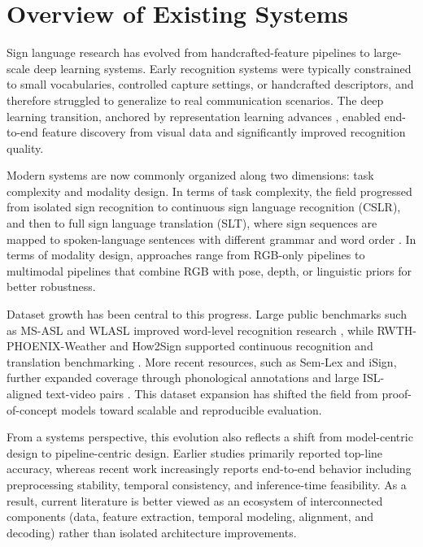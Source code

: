 \section{Overview of Existing Systems}
Sign language research has evolved from handcrafted-feature pipelines to large-scale deep learning systems. Early recognition systems were typically constrained to small vocabularies, controlled capture settings, or handcrafted descriptors, and therefore struggled to generalize to real communication scenarios. The deep learning transition, anchored by representation learning advances \cite{lecun2015deep}, enabled end-to-end feature discovery from visual data and significantly improved recognition quality.

Modern systems are now commonly organized along two dimensions: task complexity and modality design. In terms of task complexity, the field progressed from isolated sign recognition to continuous sign language recognition (CSLR), and then to full sign language translation (SLT), where sign sequences are mapped to spoken-language sentences with different grammar and word order \cite{camgoz2018neural,camgoz2020transformers}. In terms of modality design, approaches range from RGB-only pipelines to multimodal pipelines that combine RGB with pose, depth, or linguistic priors for better robustness.

Dataset growth has been central to this progress. Large public benchmarks such as MS-ASL and WLASL improved word-level recognition research \cite{joze2019msasl,li2020wlasl}, while RWTH-PHOENIX-Weather and How2Sign supported continuous recognition and translation benchmarking \cite{camgoz2018neural,duarte2021how2sign}. More recent resources, such as Sem-Lex and iSign, further expanded coverage through phonological annotations and large ISL-aligned text-video pairs \cite{kezar2023semlex,joshi2024isign}. This dataset expansion has shifted the field from proof-of-concept models toward scalable and reproducible evaluation.

From a systems perspective, this evolution also reflects a shift from model-centric design to pipeline-centric design. Earlier studies primarily reported top-line accuracy, whereas recent work increasingly reports end-to-end behavior including preprocessing stability, temporal consistency, and inference-time feasibility. As a result, current literature is better viewed as an ecosystem of interconnected components (data, feature extraction, temporal modeling, alignment, and decoding) rather than isolated architecture improvements.

